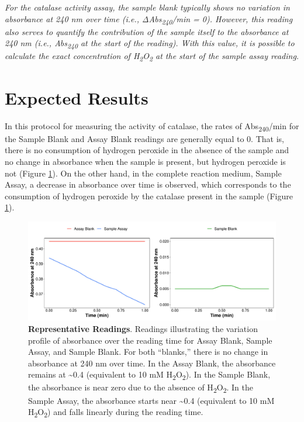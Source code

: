 \documentclass[
  9pt,
  american,
  a5paper,
  extrafontsizes,onecolumn,openright
  ]{memoir}
\begin{document}
\begin{greybox}[frametitle = Note]
\emph{For the catalase activity assay, the sample blank typically shows no variation in absorbance at 240 nm over time (i.e., ΔAbs\textsubscript{240}/min = 0). However, this reading also serves to quantify the contribution of the sample itself to the absorbance at 240 nm (i.e., Abs\textsubscript{240} at the start of the reading). With this value, it is possible to calculate the exact concentration of H\textsubscript{2}O\textsubscript{2} at the start of the sample assay reading.}

\end{greybox}

\section{Expected Results}\label{expected-results}

In this protocol for measuring the activity of catalase, the rates of Abs\textsubscript{240}/min for the Sample Blank and Assay Blank readings are generally equal to 0. That is, there is no consumption of hydrogen peroxide in the absence of the sample and no change in absorbance when the sample is present, but hydrogen peroxide is not (Figure \ref{fig:fig-cat-assay-curves}). On the other hand, in the complete reaction medium, Sample Assay, a decrease in absorbance over time is observed, which corresponds to the consumption of hydrogen peroxide by the catalase present in the sample (Figure \ref{fig:fig-cat-assay-curves}).



\scriptsize

\begin{figure}

{\centering \includegraphics[width=1\linewidth]{Volume-1_files/figure-latex/fig-cat-assay-curves-1} 

}

\caption{\textbf{Representative Readings}. Readings illustrating the variation profile of absorbance over the reading time for Assay Blank, Sample Assay, and Sample Blank. For both \enquote{blanks,} there is no change in absorbance at 240 nm over time. In the Assay Blank, the absorbance remains at \textasciitilde0.4 (equivalent to 10 mM H\textsubscript{2}O\textsubscript{2}). In the Sample Blank, the absorbance is near zero due to the absence of H\textsubscript{2}O\textsubscript{2}. In the Sample Assay, the absorbance starts near \textasciitilde0.4 (equivalent to 10 mM H\textsubscript{2}O\textsubscript{2}) and falls linearly during the reading time.}\label{fig:fig-cat-assay-curves}
\end{figure}
\end{document}
